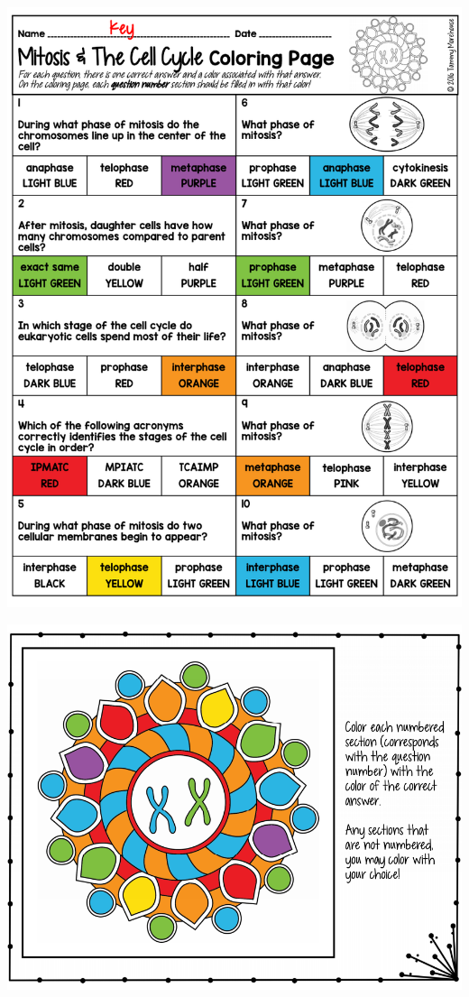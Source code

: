 \documentclass[
]{book}
\begin{document}
\includegraphics{./img/p1-2.png}

\includegraphics{./img/p1-3.png}
\end{document}
